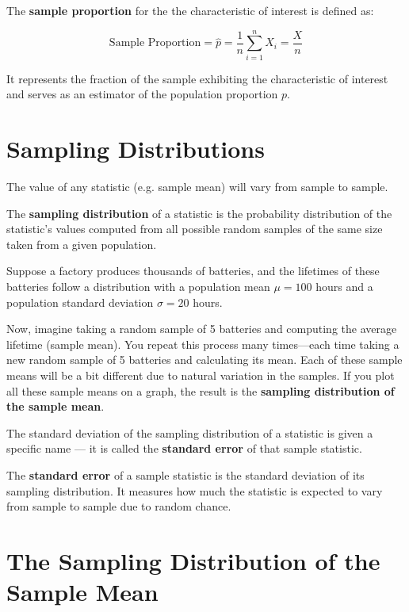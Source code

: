 \documentclass[twoside]{book}
\begin{document}
The \textbf{sample proportion} for the the characteristic of interest is defined as:
\begin{textbox}
\[
\text{Sample Proportion} = \hat{p} = \frac{1}{n} \sum_{i=1}^n X_i = \frac{X}{n}
\]
\end{textbox}

It represents the fraction of the sample exhibiting the characteristic of interest and serves as an estimator of the population proportion \( p \).



\section{Sampling Distributions}
The value of any statistic (e.g. sample mean) will vary from sample to sample.
\begin{textbox}
The \textbf{sampling distribution} of a statistic is the probability distribution of the statistic's values computed from all possible random samples of the same size taken from a given population.
\end{textbox}

Suppose a factory produces thousands of batteries, and the lifetimes of these batteries follow a distribution with a population mean \( \mu = 100 \) hours and a population standard deviation \( \sigma = 20 \) hours.

Now, imagine taking a random sample of 5 batteries and computing the average lifetime (sample mean). You repeat this process many times—each time taking a new random sample of 5 batteries and calculating its mean. Each of these sample means will be a bit different due to natural variation in the samples. If you plot all these sample means on a graph, the result is the \textbf{sampling distribution of the sample mean}.

The standard deviation of the sampling distribution of a statistic is given a specific name — it is called the \textbf{standard error} of that sample statistic.

\begin{textbox}
The \textbf{standard error} of a sample statistic is the standard deviation of its sampling distribution. It measures how much the statistic is expected to vary from sample to sample due to random chance.
\end{textbox}

\section{The Sampling Distribution of the Sample Mean}
\end{document}
